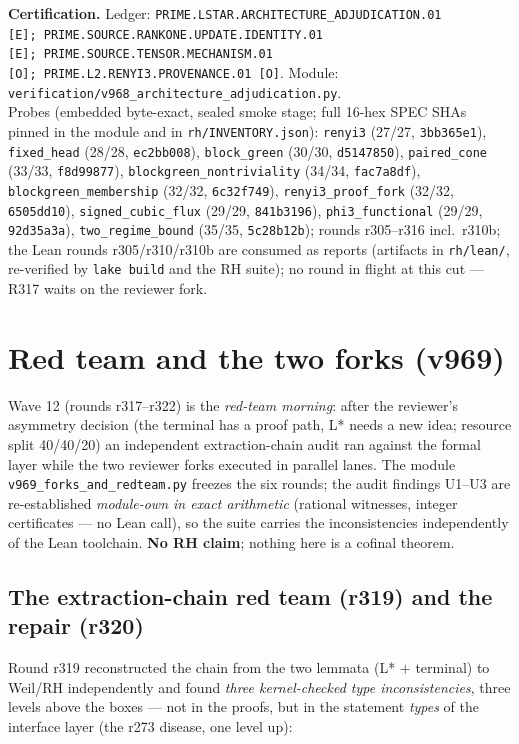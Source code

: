 \documentclass[11pt]{article}
\newcommand{\certbox}[3]{%
  \par\medskip\noindent\colorbox{certgray}{\parbox{\dimexpr\linewidth-2\fboxsep}{%
    \footnotesize\raggedright\textbf{Certification.} Ledger: \texttt{#1}.\quad
    Module: \texttt{#2}.\\ #3}}\par\medskip}
\theoremstyle{definition}
\theoremstyle{remark}
\begin{document}
\certbox{PRIME.LSTAR.ARCHITECTURE\_ADJUDICATION.01 [E];\
PRIME.SOURCE.RANKONE.UPDATE.IDENTITY.01 [E];\
PRIME.SOURCE.TENSOR.MECHANISM.01 [O];\
PRIME.L2.RENYI3.PROVENANCE.01 [O]}%
{verification/v968\_architecture\_adjudication.py}%
{Probes (embedded byte-exact, sealed smoke stage; full 16-hex SPEC
SHAs pinned in the module and in \texttt{rh/INVENTORY.json}):
\texttt{renyi3} (27/27, \texttt{3bb365e1}),
\texttt{fixed\_head} (28/28, \texttt{ec2bb008}),
\texttt{block\_green} (30/30, \texttt{d5147850}),
\texttt{paired\_cone} (33/33, \texttt{f8d99877}),
\texttt{blockgreen\_nontriviality} (34/34, \texttt{fac7a8df}),
\texttt{blockgreen\_membership} (32/32, \texttt{6c32f749}),
\texttt{renyi3\_proof\_fork} (32/32, \texttt{6505dd10}),
\texttt{signed\_cubic\_flux} (29/29, \texttt{841b3196}),
\texttt{phi3\_functional} (29/29, \texttt{92d35a3a}),
\texttt{two\_regime\_bound} (35/35, \texttt{5c28b12b});
rounds r305--r316 incl.\ r310b; the Lean rounds r305/r310/r310b are
consumed as reports (artifacts in \texttt{rh/lean/}, re-verified by
\texttt{lake build} and the RH suite); no round in flight at this
cut --- R317 waits on the reviewer fork.}

\section{Red team and the two forks (v969)}\label{sec:forks-redteam}

Wave 12 (rounds r317--r322) is the \emph{red-team morning}: after the
reviewer's asymmetry decision (the terminal has a proof path, L*
needs a new idea; resource split 40/40/20) an independent
extraction-chain audit ran against the formal layer while the two
reviewer forks executed in parallel lanes.  The module
\texttt{v969\_forks\_and\_redteam.py} freezes the six rounds; the
audit findings U1--U3 are re-established \emph{module-own in exact
arithmetic} (rational witnesses, integer certificates --- no Lean
call), so the suite carries the inconsistencies independently of the
Lean toolchain.  \textbf{No RH claim}; nothing here is a cofinal
theorem.

\subsection{The extraction-chain red team (r319) and the repair
(r320)}\label{sec:redteam}

Round r319 reconstructed the chain from the two lemmata
(L* $+$ terminal) to Weil/RH independently and found \emph{three
kernel-checked type inconsistencies}, three levels above the boxes
--- not in the proofs, but in the statement \emph{types} of the
interface layer (the r273 disease, one level up):
\end{document}
